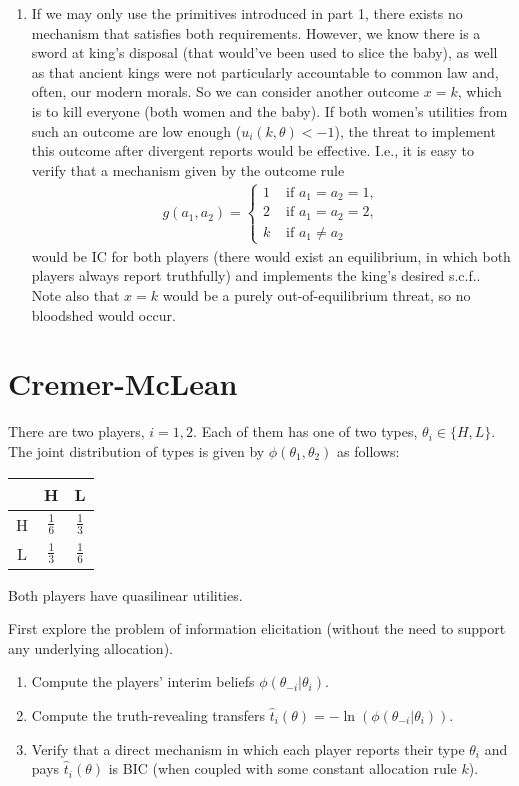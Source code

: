 \documentclass[a4paper]{article}
\begin{document}
\begin{enumerate}
	\item If we may only use the primitives introduced in part 1, there exists no mechanism that satisfies both requirements. However, we know there is a sword at king's disposal (that would've been used to slice the baby), as well as that ancient kings were not particularly accountable to common law and, often, our modern morals. So we can consider another outcome $x = k$, which is to kill everyone (both women and the baby). If both women's utilities from such an outcome are low enough ($u_i(k,\theta) < -1$), the threat to implement this outcome after divergent reports would be effective. I.e., it is easy to verify that a mechanism given by the outcome rule
	\begin{align*}
		g(a_1,a_2) = \begin{cases}
			1 & \text{ if } a_1=a_2=1, 
			\\
			2 & \text{ if } a_1=a_2=2, 
			\\
			k & \text{ if } a_1 \neq a_2 
		\end{cases}
	\end{align*}
	would be IC for both players (there would exist an equilibrium, in which both players always report truthfully) and implements the king's desired s.c.f.. Note also that $x=k$ would be a purely out-of-equilibrium threat, so no bloodshed would occur.
\end{enumerate}
\fi 



\section{Cremer-McLean}
	There are two players, $i=1,2$. Each of them has one of two types, $\theta_i \in \{H,L\}$. The joint distribution of types is given by $\phi(\theta_1,\theta_2)$ as follows:
	\begin{center}
		\begin{tabular}{c | c | c |}
			& H 				& L					\\ \hline
			H	& $\frac{1}{6}$ 	& $\frac{1}{3}$ 	\\ \hline
			L	& $\frac{1}{3}$ 	& $\frac{1}{6}$		\\ \hline
		\end{tabular}
	\end{center}
	Both players have quasilinear utilities.
	
	First explore the problem of information elicitation (without the need to support any underlying allocation). 
	\begin{enumerate}
		\item Compute the players' interim beliefs $\phi(\theta_{-i} | \theta_i)$.
		\item Compute the truth-revealing transfers $\hat{t}_i(\theta) = -\ln(\phi(\theta_{-i} | \theta_i))$.
		\item Verify that a direct mechanism in which each player reports their type $\theta_i$ and pays $\hat{t}_i(\theta)$ is BIC (when coupled with some constant allocation rule $k$).
	\end{enumerate}
	
\end{document}
